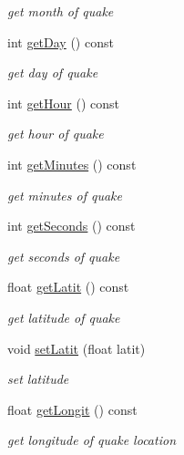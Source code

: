 \begin{DoxyCompactItemize}
\begin{DoxyCompactList}\small\item\em get month of quake \end{DoxyCompactList}\item 
int \hyperlink{classbridges_1_1dataset_1_1_earthquake_u_s_g_s_a6052793e29a4d9708ebf35cb8477ed0d}{get\+Day} () const
\begin{DoxyCompactList}\small\item\em get day of quake \end{DoxyCompactList}\item 
int \hyperlink{classbridges_1_1dataset_1_1_earthquake_u_s_g_s_a43e64f31d62d11ad554be5f5388720f6}{get\+Hour} () const
\begin{DoxyCompactList}\small\item\em get hour of quake \end{DoxyCompactList}\item 
int \hyperlink{classbridges_1_1dataset_1_1_earthquake_u_s_g_s_a2ca08fed1bfc867277dbd99cf25fa3ec}{get\+Minutes} () const
\begin{DoxyCompactList}\small\item\em get minutes of quake \end{DoxyCompactList}\item 
int \hyperlink{classbridges_1_1dataset_1_1_earthquake_u_s_g_s_af91ae1415cc7e0b82a5d288b7e033cd0}{get\+Seconds} () const
\begin{DoxyCompactList}\small\item\em get seconds of quake \end{DoxyCompactList}\item 
float \hyperlink{classbridges_1_1dataset_1_1_earthquake_u_s_g_s_aea3eca11487e572ead2ed91197d3d387}{get\+Latit} () const
\begin{DoxyCompactList}\small\item\em get latitude of quake \end{DoxyCompactList}\item 
void \hyperlink{classbridges_1_1dataset_1_1_earthquake_u_s_g_s_a68e7b4a3f74e57c574a5d09dc36a27ae}{set\+Latit} (float latit)
\begin{DoxyCompactList}\small\item\em set latitude \end{DoxyCompactList}\item 
float \hyperlink{classbridges_1_1dataset_1_1_earthquake_u_s_g_s_aab856d62ca076b54fff0e2b2a6b131d9}{get\+Longit} () const
\begin{DoxyCompactList}\small\item\em get longitude of quake location \end{DoxyCompactList}\item 

\end{DoxyCompactItemize}
